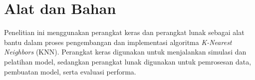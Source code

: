 
\section{Alat dan Bahan}
\par Penelitian ini menggunakan perangkat keras dan perangkat lunak sebagai alat bantu dalam proses pengembangan dan implementasi algoritma \textit{K-Nearest Neighbors} (KNN). Perangkat keras digunakan untuk menjalankan simulasi dan pelatihan model, sedangkan perangkat lunak digunakan untuk pemrosesan data, pembuatan model, serta evaluasi performa. 

